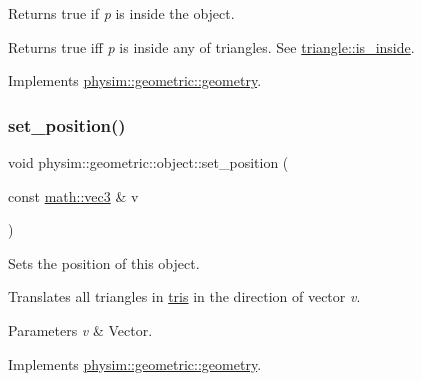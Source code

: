 Returns true if {\itshape p} is inside the object. 

Returns true iff {\itshape p} is inside any of triangles. See \hyperlink{classphysim_1_1geometric_1_1triangle_a735cfae7db71f5d6105011c40595ca37}{triangle\+::is\+\_\+inside}. 

Implements \hyperlink{classphysim_1_1geometric_1_1geometry_a325d4049d4e14584b389a2f1202bdc08}{physim\+::geometric\+::geometry}.

\mbox{\label{classphysim_1_1geometric_1_1object_ab1efcebf4013206cee817beeb0415cd6}} 
\subsubsection{\texorpdfstring{set\+\_\+position()}{set\_position()}}
{\footnotesize\ttfamily void physim\+::geometric\+::object\+::set\+\_\+position (\begin{DoxyParamCaption}\item[{const \hyperlink{structphysim_1_1math_1_1vec3}{math\+::vec3} \&}]{v }\end{DoxyParamCaption})\hspace{0.3cm}{\ttfamily [virtual]}}



Sets the position of this object. 

Translates all triangles in \hyperlink{classphysim_1_1geometric_1_1object_a0a7ba3bc4dda95651acdc046342e437c}{tris} in the direction of vector {\itshape v}. 
\begin{DoxyParams}{Parameters}
{\em v} & Vector. \\
\hline
\end{DoxyParams}


Implements \hyperlink{classphysim_1_1geometric_1_1geometry_a5b029b5fa8e55847d5aa06b1d341c88c}{physim\+::geometric\+::geometry}.

\mbox{\label{classphysim_1_1geometric_1_1object_a637c4792d486f76fb0c0dabeb0b468ea}} 
